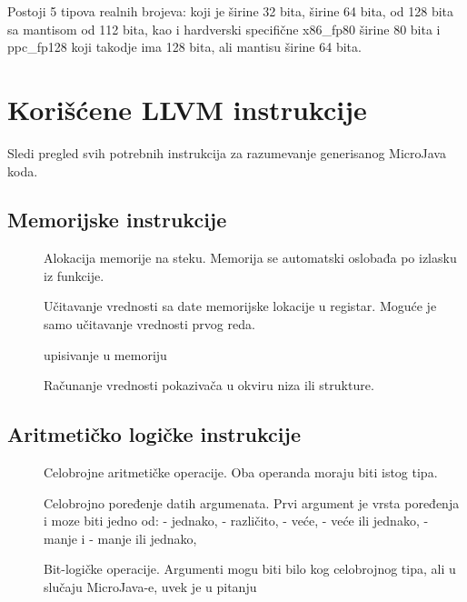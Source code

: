 Postoji 5 tipova realnih brojeva: 
 koji je širine 32 bita, 
 širine 64 bita, 
 od 128 bita sa mantisom od 112 bita, 
kao i hardverski specifične x86\_{}fp80 širine 80 bita 
i ppc\_{}fp128 koji takodje ima 128 bita, ali mantisu širine 64 bita.


\section{Korišćene LLVM instrukcije}

Sledi pregled svih potrebnih instrukcija za razumevanje generisanog MicroJava koda.

\subsection*{Memorijske instrukcije}

\begin{description}
\item[] Alokacija memorije na steku. Memorija se automatski oslobađa po izlasku iz funkcije.
\item[] Učitavanje vrednosti sa date memorijske lokacije u registar. Moguće je samo učitavanje vrednosti prvog reda.
\item[] upisivanje u memoriju
\item[] Računanje vrednosti pokazivača u okviru niza ili strukture.
\end{description}

\subsection*{Aritmetičko logičke instrukcije}

\begin{description}
\item[] Celobrojne aritmetičke operacije. Oba operanda moraju biti istog tipa.
\item[] Celobrojno poređenje datih argumenata. Prvi argument je vrsta poređenja i moze biti
jedno od:  - jednako,   - različito,  - veće,  - veće ili jednako,   - manje i   - manje ili jednako, 
\item[] Bit-logičke operacije. Argumenti mogu biti bilo kog celobrojnog tipa, ali u slučaju MicroJava-e, uvek je u pitanju 
\end{description}

